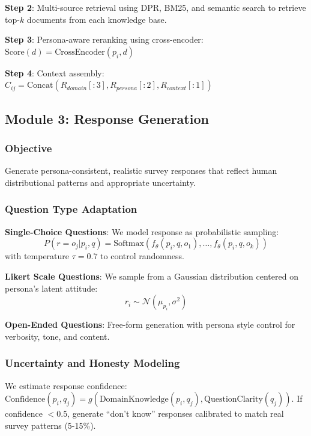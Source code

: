 \documentclass[sigconf,nonarchival]{acmart}
\begin{document}
\textbf{Step 2}: Multi-source retrieval using DPR, BM25, and semantic search to retrieve top-$k$ documents from each knowledge base.

\textbf{Step 3}: Persona-aware reranking using cross-encoder: $\text{Score}(d) = \text{CrossEncoder}(p_i, d)$

\textbf{Step 4}: Context assembly: $C_{ij} = \text{Concat}(R_{domain}[:3], R_{persona}[:2], R_{context}[:1])$

\subsection{Module 3: Response Generation}

\subsubsection{Objective}

Generate persona-consistent, realistic survey responses that reflect human distributional patterns and appropriate uncertainty.

\subsubsection{Question Type Adaptation}

\textbf{Single-Choice Questions}: We model response as probabilistic sampling:
\begin{equation}
P(r = o_j | p_i, q) = \text{Softmax}(f_\theta(p_i, q, o_1), \ldots, f_\theta(p_i, q, o_k))
\end{equation}
with temperature $\tau=0.7$ to control randomness.

\textbf{Likert Scale Questions}: We sample from a Gaussian distribution centered on persona's latent attitude:
\begin{equation}
r_i \sim \mathcal{N}(\mu_{p_i}, \sigma^2)
\end{equation}

\textbf{Open-Ended Questions}: Free-form generation with persona style control for verbosity, tone, and content.

\subsubsection{Uncertainty and Honesty Modeling}

We estimate response confidence: $\text{Confidence}(p_i, q_j) = g(\text{DomainKnowledge}(p_i, q_j), \text{QuestionClarity}(q_j))$. If confidence $< 0.5$, generate ``don't know'' responses calibrated to match real survey patterns (5-15\%).
\end{document}
